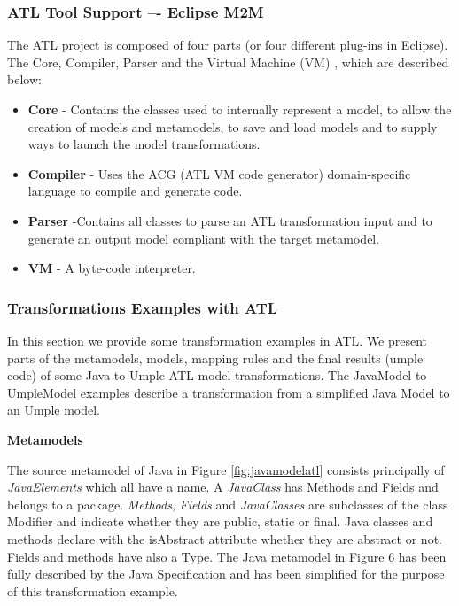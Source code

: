 \subsubsection{ATL Tool Support –- Eclipse M2M}
The ATL project is composed of four parts (or four different plug-ins in Eclipse). The Core, Compiler, Parser and the Virtual Machine (VM) \cite{Jouault200831}, which are described below:

\begin{itemize}
\item \textbf{Core} - Contains the classes used to internally represent a model, to allow the creation of models and metamodels, to save and load models and to supply ways to launch the model transformations. 
\item \textbf{Compiler} - Uses the ACG (ATL VM code generator) domain-specific language to compile and generate code. 
\item \textbf{Parser} -Contains all classes to parse an ATL transformation input and to generate an output model compliant with the target metamodel.
\item \textbf{VM} - A byte-code interpreter.
\end{itemize}

\subsubsection{Transformations Examples with ATL}
\label{subsubsec:exampleATL}

In this section we provide some transformation examples in ATL. We present parts of the metamodels, models, mapping rules and the final results (umple code) of some Java to Umple ATL model transformations.
The JavaModel to UmpleModel examples describe a transformation from a simplified Java Model to an Umple model. 

\textbf{Metamodels} 

The source metamodel of Java in Figure \ref{fig:javamodelatl} consists principally of \textit{JavaElements} which all have a name. A \textit{JavaClass} has Methods and Fields and belongs to a package. \textit{Methods}, \textit{Fields} and \textit{JavaClasses} are subclasses of the class Modifier and indicate whether they are public, static or final. Java classes and methods declare with the isAbstract attribute whether they are abstract or not. Fields and methods have also a Type. The Java metamodel in Figure 6 has been fully described by the Java Specification \cite{javaSpec} and has been simplified for the purpose of this transformation example.


